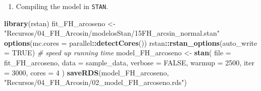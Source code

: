 \documentclass[
  12pt,
]{book}
\newenvironment{Shaded}{\begin{snugshade}}{\end{snugshade}}
\newcommand{\AttributeTok}[1]{\textcolor[rgb]{0.13,0.29,0.53}{#1}}
\newcommand{\CommentTok}[1]{\textcolor[rgb]{0.56,0.35,0.01}{\textit{#1}}}
\newcommand{\ConstantTok}[1]{\textcolor[rgb]{0.56,0.35,0.01}{#1}}
\newcommand{\DecValTok}[1]{\textcolor[rgb]{0.00,0.00,0.81}{#1}}
\newcommand{\FunctionTok}[1]{\textcolor[rgb]{0.13,0.29,0.53}{\textbf{#1}}}
\newcommand{\NormalTok}[1]{#1}
\newcommand{\OtherTok}[1]{\textcolor[rgb]{0.56,0.35,0.01}{#1}}
\newcommand{\SpecialCharTok}[1]{\textcolor[rgb]{0.81,0.36,0.00}{\textbf{#1}}}
\newcommand{\StringTok}[1]{\textcolor[rgb]{0.31,0.60,0.02}{#1}}
\providecommand{\tightlist}{%
  \setlength{\itemsep}{0pt}\setlength{\parskip}{0pt}}
\begin{document}
\begin{Shaded}
\end{Shaded}

\begin{enumerate}
\def\labelenumi{\arabic{enumi}.}
\setcounter{enumi}{3}
\tightlist
\item
  Compiling the model in \texttt{STAN}.
\end{enumerate}

\begin{Shaded}
\begin{Highlighting}[]
\FunctionTok{library}\NormalTok{(rstan)}
\NormalTok{fit\_FH\_arcoseno }\OtherTok{\textless{}{-}} \StringTok{"Recursos/04\_FH\_Arcosin/modelosStan/15FH\_arcsin\_normal.stan"}
\FunctionTok{options}\NormalTok{(}\AttributeTok{mc.cores =}\NormalTok{ parallel}\SpecialCharTok{::}\FunctionTok{detectCores}\NormalTok{())}
\NormalTok{rstan}\SpecialCharTok{::}\FunctionTok{rstan\_options}\NormalTok{(}\AttributeTok{auto\_write =} \ConstantTok{TRUE}\NormalTok{) }\CommentTok{\# speed up running time }
\NormalTok{model\_FH\_arcoseno }\OtherTok{\textless{}{-}} \FunctionTok{stan}\NormalTok{(}
  \AttributeTok{file =}\NormalTok{ fit\_FH\_arcoseno,  }
  \AttributeTok{data =}\NormalTok{ sample\_data,   }
  \AttributeTok{verbose =} \ConstantTok{FALSE}\NormalTok{,}
  \AttributeTok{warmup =} \DecValTok{2500}\NormalTok{,         }
  \AttributeTok{iter =} \DecValTok{3000}\NormalTok{,            }
  \AttributeTok{cores =} \DecValTok{4}              
\NormalTok{)}
\FunctionTok{saveRDS}\NormalTok{(model\_FH\_arcoseno,}
        \StringTok{"Recursos/04\_FH\_Arcosin/02\_model\_FH\_arcoseno.rds"}\NormalTok{)}
\end{Highlighting}
\end{Shaded}
\end{document}

